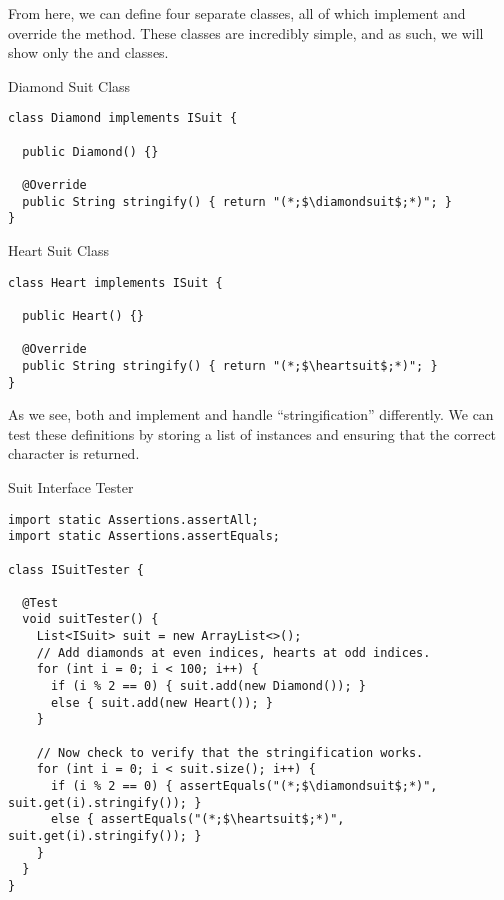 From here, we can define four separate classes, all of which implement  and override the  method. These classes are incredibly simple, and as such, we will show only the  and  classes.

\begin{cl}[]{Diamond Suit Class}
\begin{lstlisting}[language=MyJava]
class Diamond implements ISuit {
  
  public Diamond() {}

  @Override
  public String stringify() { return "(*;$\diamondsuit$;*)"; }
}
\end{lstlisting}
\end{cl}

\begin{cl}[]{Heart Suit Class}
\begin{lstlisting}[language=MyJava]
class Heart implements ISuit {
    
  public Heart() {}

  @Override
  public String stringify() { return "(*;$\heartsuit$;*)"; }
}
\end{lstlisting}
\end{cl}

As we see, both  and  implement  and handle ``stringification'' differently. We can test these definitions by storing a list of  instances and ensuring that the correct character is returned.

\begin{cl}[]{Suit Interface Tester}
\begin{lstlisting}[language=MyJava]
import static Assertions.assertAll;
import static Assertions.assertEquals;

class ISuitTester {

  @Test
  void suitTester() {
    List<ISuit> suit = new ArrayList<>();
    // Add diamonds at even indices, hearts at odd indices.
    for (int i = 0; i < 100; i++) {
      if (i % 2 == 0) { suit.add(new Diamond()); }
      else { suit.add(new Heart()); }
    }

    // Now check to verify that the stringification works.
    for (int i = 0; i < suit.size(); i++) {
      if (i % 2 == 0) { assertEquals("(*;$\diamondsuit$;*)", suit.get(i).stringify()); }
      else { assertEquals("(*;$\heartsuit$;*)", suit.get(i).stringify()); }
    }
  }
}
\end{lstlisting}
\end{cl}

